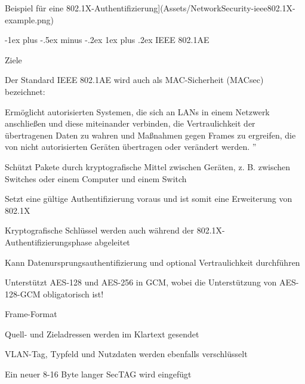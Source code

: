 \documentclass[a4paper]{article}
\makeatletter
\renewcommand{\subsubsection}{\@startsection{subsubsection}{3}{0mm}%
 {-1ex plus -.5ex minus -.2ex}%
 {1ex plus .2ex}%
 {\normalfont\small\bfseries}}
\makeatother
\begin{document}
\begin{multicols}{3}
      Beispiel für eine
      802.1X-Authentifizierung{]}(Assets/NetworkSecurity-ieee802.1X-example.png)


      \subsubsection{IEEE 802.1AE}

      Ziele

      \begin{itemize*}
            \item
            Der Standard IEEE 802.1AE wird auch als MAC-Sicherheit (MACsec)
            bezeichnet:

            \begin{itemize*}
                  \item Ermöglicht autorisierten Systemen, die sich an LANs in einem Netzwerk anschließen und diese miteinander verbinden, die Vertraulichkeit der übertragenen Daten zu wahren und Maßnahmen gegen Frames zu ergreifen, die von nicht autorisierten Geräten übertragen oder verändert werden. ''
                  \item Schützt Pakete durch kryptografische Mittel zwischen Geräten, z. B. zwischen Switches oder einem Computer und einem Switch
                  \item Setzt eine gültige Authentifizierung voraus und ist somit eine Erweiterung von 802.1X
                  \item Kryptografische Schlüssel werden auch während der 802.1X-Authentifizierungsphase abgeleitet
                  \item Kann Datenursprungsauthentifizierung und optional Vertraulichkeit durchführen
                  \item Unterstützt AES-128 und AES-256 in GCM, wobei die Unterstützung von AES-128-GCM obligatorisch ist!
            \end{itemize*}
      \end{itemize*}

      Frame-Format

      \begin{itemize*}
            \item
            Quell- und Zieladressen werden im Klartext gesendet
            \item
            VLAN-Tag, Typfeld und Nutzdaten werden ebenfalls verschlüsselt
            \item
            Ein neuer 8-16 Byte langer SecTAG wird eingefügt


\end{itemize*}
\end{multicols}
\end{document}
